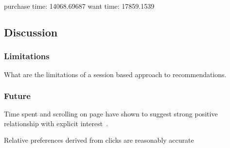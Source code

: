     purchase time: 14068.69687
    want time: 17859.1539



\subsection{Discussion}

\subsubsection{Limitations}
    What are the limitations of a session based approach to recommendations.

\subsubsection{Future}
    Time spent and scrolling on page have shown to suggest strong positive relationship with explicit interest~\cite{Claypool01inferringuser}.

    Relative preferences derived from clicks are reasonably accurate~\cite{Joachims:2007:EAI:1229179.1229181}
